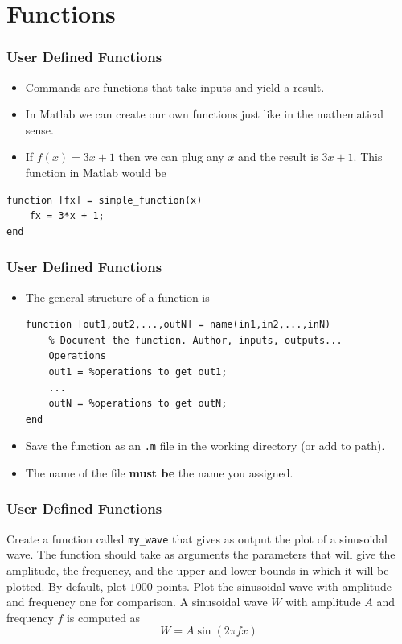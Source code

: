 \documentclass[11pt,xcolor={svgnames},aspectratio=169,usepdftitle=false]{beamer}
\begin{document}
\section{Functions}

\begin{frame}[fragile]
    \frametitle{User Defined Functions}
\begin{itemize}
    \item Commands are functions that take inputs and yield a result.
    \item In Matlab we can create our own functions just like in the mathematical sense.
    \item If $f(x) = 3x + 1$ then we can plug any $x$ and the result is $3x + 1$. This function in Matlab would be
\end{itemize}
\begin{lstlisting}
function [fx] = simple_function(x)
    fx = 3*x + 1;
end
\end{lstlisting}
\end{frame}

\begin{frame}[fragile]
    \frametitle{User Defined Functions}
\begin{itemize}
    \item The general structure of a function is
\begin{lstlisting}
function [out1,out2,...,outN] = name(in1,in2,...,inN)
    % Document the function. Author, inputs, outputs...
    Operations
    out1 = %operations to get out1;
    ...
    outN = %operations to get outN;
end
\end{lstlisting}
    \item Save the function as an \verb;.m; file in the working directory (or add to path).
    \item The name of the file \alert{\textbf{must be}} the name you assigned.
\end{itemize}
\end{frame}

\begin{frame}[fragile]
    \frametitle{User Defined Functions}
\begin{exercise}
Create a function called \verb;my_wave; that gives as output the plot of a sinusoidal wave. The function should take as arguments the parameters that will give the amplitude, the frequency, and the upper and lower bounds in which it will be plotted. By default, plot $1000$ points. Plot the sinusoidal wave with amplitude and frequency one for comparison. A sinusoidal wave $W$ with amplitude $A$ and frequency $f$ is computed as 
\[
W = A \sin(2\pi f x)
\]
\end{exercise}
\end{frame}
\end{document}
